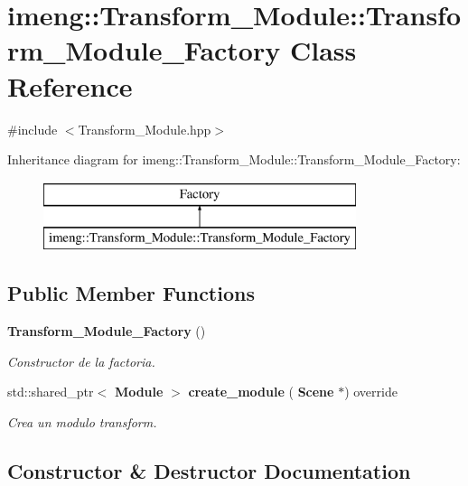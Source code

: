 \section{imeng\+::Transform\+\_\+\+Module\+::Transform\+\_\+\+Module\+\_\+\+Factory Class Reference}
\label{classimeng_1_1_transform___module_1_1_transform___module___factory}


{\ttfamily \#include $<$Transform\+\_\+\+Module.\+hpp$>$}

Inheritance diagram for imeng\+::Transform\+\_\+\+Module\+::Transform\+\_\+\+Module\+\_\+\+Factory\+:\begin{figure}[H]
\begin{center}
\leavevmode
\includegraphics[height=2.000000cm]{classimeng_1_1_transform___module_1_1_transform___module___factory}
\end{center}
\end{figure}
\subsection*{Public Member Functions}
\begin{DoxyCompactItemize}
\item 
\textbf{ Transform\+\_\+\+Module\+\_\+\+Factory} ()
\begin{DoxyCompactList}\small\item\em Constructor de la factoria. \end{DoxyCompactList}\item 
std\+::shared\+\_\+ptr$<$ \textbf{ Module} $>$ \textbf{ create\+\_\+module} (\textbf{ Scene} $\ast$) override
\begin{DoxyCompactList}\small\item\em Crea un modulo transform. \end{DoxyCompactList}\end{DoxyCompactItemize}


\subsection{Constructor \& Destructor Documentation}
\mbox{\label{classimeng_1_1_transform___module_1_1_transform___module___factory_aedfd200856db491aa5f13f49446e36d0}} 
